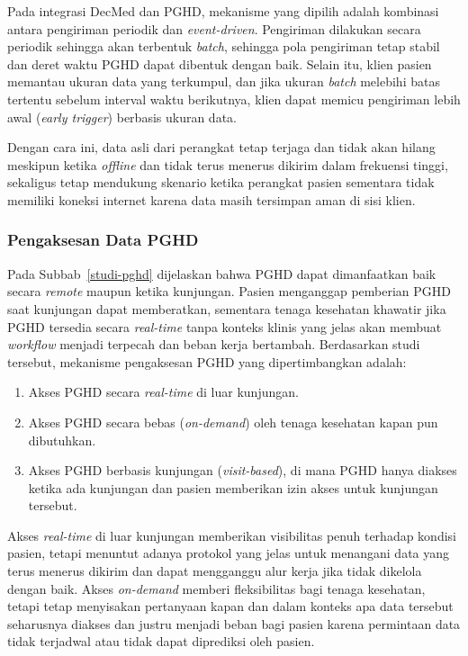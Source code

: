 Pada integrasi DecMed dan PGHD, mekanisme yang dipilih adalah kombinasi antara pengiriman periodik dan \textit{event-driven}. 
Pengiriman dilakukan secara periodik sehingga akan terbentuk \textit{batch}, sehingga pola pengiriman tetap stabil dan deret waktu PGHD dapat dibentuk dengan baik.
Selain itu, klien pasien memantau ukuran data yang terkumpul, dan jika ukuran \textit{batch} melebihi batas tertentu sebelum interval waktu berikutnya, klien dapat memicu pengiriman lebih awal (\textit{early trigger}) berbasis ukuran data.

Dengan cara ini, data asli dari perangkat tetap terjaga dan tidak akan hilang meskipun ketika \textit{offline} dan tidak terus menerus dikirim dalam frekuensi tinggi, sekaligus tetap mendukung skenario ketika perangkat pasien sementara tidak memiliki koneksi internet karena data masih tersimpan aman di sisi klien.
\subsubsection{Pengaksesan Data PGHD}\label{alternatif-pengaksesan-pghd}

Pada Subbab~\ref{studi-pghd} dijelaskan bahwa PGHD dapat dimanfaatkan baik secara \textit{remote} maupun ketika kunjungan. 
Pasien menganggap pemberian PGHD saat kunjungan dapat memberatkan, sementara tenaga kesehatan khawatir jika PGHD tersedia secara \textit{real-time} tanpa konteks klinis yang jelas akan membuat \textit{workflow} menjadi terpecah dan beban kerja bertambah.
Berdasarkan studi tersebut, mekanisme pengaksesan PGHD yang dipertimbangkan adalah:

\begin{enumerate}
  \item Akses PGHD secara \textit{real-time} di luar kunjungan.
  \item Akses PGHD secara bebas (\textit{on-demand}) oleh tenaga kesehatan kapan pun dibutuhkan.
  \item Akses PGHD berbasis kunjungan (\textit{visit-based}), di mana PGHD hanya diakses ketika ada kunjungan dan pasien memberikan izin akses untuk kunjungan tersebut.
\end{enumerate}

Akses \textit{real-time} di luar kunjungan memberikan visibilitas penuh terhadap kondisi pasien, tetapi menuntut adanya protokol yang jelas untuk menangani data yang terus menerus dikirim dan dapat mengganggu alur kerja jika tidak dikelola dengan baik.
Akses \textit{on-demand} memberi fleksibilitas bagi tenaga kesehatan, tetapi tetap menyisakan pertanyaan kapan dan dalam konteks apa data tersebut seharusnya diakses dan justru menjadi beban bagi pasien karena permintaan data tidak terjadwal atau tidak dapat diprediksi oleh pasien.

